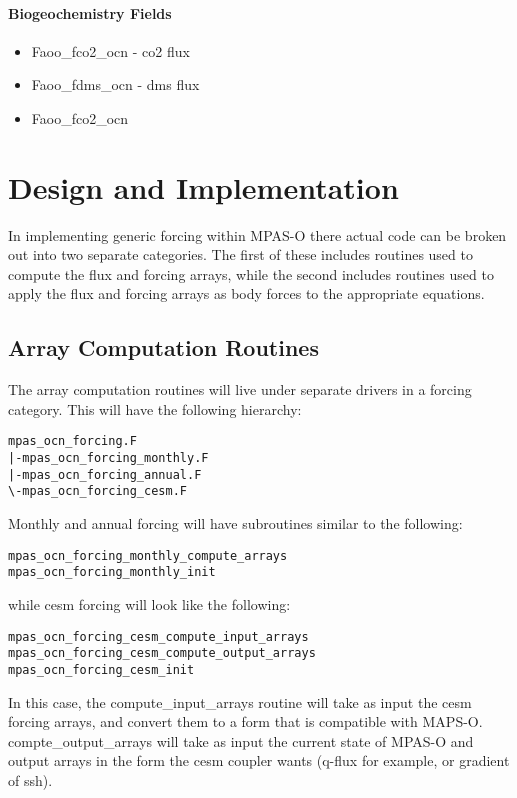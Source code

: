 \documentclass[11pt]{report}
\begin{document}
\subsubsection{Biogeochemistry Fields}
\begin{itemize}
	\item Faoo\_fco2\_ocn  - co2 flux
	\item Faoo\_fdms\_ocn  - dms flux
	\item Faoo\_fco2\_ocn  
\end{itemize}

\chapter{Design and Implementation}

In implementing generic forcing within MPAS-O there actual code can be broken out into two separate categories. The first of these includes routines used to compute the flux and forcing arrays, while the second includes routines used to apply the flux and forcing arrays as body forces to the appropriate equations.

\section{Array Computation Routines}
The array computation routines will live under separate drivers in a forcing category. This will have the following hierarchy: 

\begin{lstlisting}
mpas_ocn_forcing.F
|-mpas_ocn_forcing_monthly.F
|-mpas_ocn_forcing_annual.F
\-mpas_ocn_forcing_cesm.F
\end{lstlisting} 

Monthly and annual forcing will have subroutines similar to the following: 

\begin{lstlisting}
mpas_ocn_forcing_monthly_compute_arrays
mpas_ocn_forcing_monthly_init
\end{lstlisting} 

while cesm forcing will look like the following: 

\begin{lstlisting}
mpas_ocn_forcing_cesm_compute_input_arrays
mpas_ocn_forcing_cesm_compute_output_arrays
mpas_ocn_forcing_cesm_init
\end{lstlisting} 

In this case, the compute\_input\_arrays routine will take as input the cesm forcing arrays, and convert them to a form that is compatible with MAPS-O. compte\_output\_arrays will take as input the current state of MPAS-O and output arrays in the form the cesm coupler wants (q-flux for example, or gradient of ssh).
\end{document}
